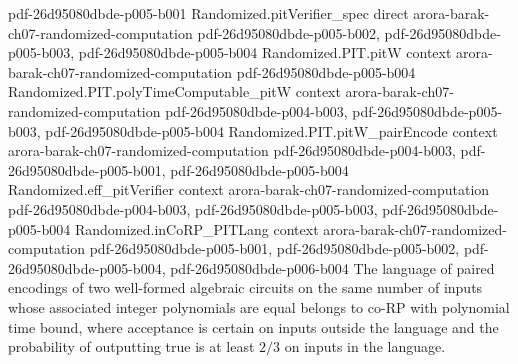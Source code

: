 \begin{theorem}
{    pdf-26d95080dbde-p005-b001}
\proofstep
  {Randomized.pitVerifier_spec}
  {direct}
  {arora-barak-ch07-randomized-computation}
  {pdf-26d95080dbde-p005-b002,
    pdf-26d95080dbde-p005-b003,
    pdf-26d95080dbde-p005-b004}
\proofstep
  {Randomized.PIT.pitW}
  {context}
  {arora-barak-ch07-randomized-computation}
  {pdf-26d95080dbde-p005-b004}
\proofstep
  {Randomized.PIT.polyTimeComputable_pitW}
  {context}
  {arora-barak-ch07-randomized-computation}
  {pdf-26d95080dbde-p004-b003,
    pdf-26d95080dbde-p005-b003,
    pdf-26d95080dbde-p005-b004}
\proofstep
  {Randomized.PIT.pitW_pairEncode}
  {context}
  {arora-barak-ch07-randomized-computation}
  {pdf-26d95080dbde-p004-b003,
    pdf-26d95080dbde-p005-b001,
    pdf-26d95080dbde-p005-b004}
\proofstep
  {Randomized.eff_pitVerifier}
  {context}
  {arora-barak-ch07-randomized-computation}
  {pdf-26d95080dbde-p004-b003,
    pdf-26d95080dbde-p005-b003,
    pdf-26d95080dbde-p005-b004}
\proofstep
  {Randomized.inCoRP_PITLang}
  {context}
  {arora-barak-ch07-randomized-computation}
  {pdf-26d95080dbde-p005-b001,
    pdf-26d95080dbde-p005-b002,
    pdf-26d95080dbde-p005-b004,
    pdf-26d95080dbde-p006-b004}
The language of paired encodings of two well-formed algebraic circuits on the same
number of inputs whose associated integer polynomials are equal belongs to co-RP with
polynomial time bound, where acceptance is certain on inputs outside the language and
the probability of outputting true is at least $2/3$ on inputs in the language.
\end{theorem}

